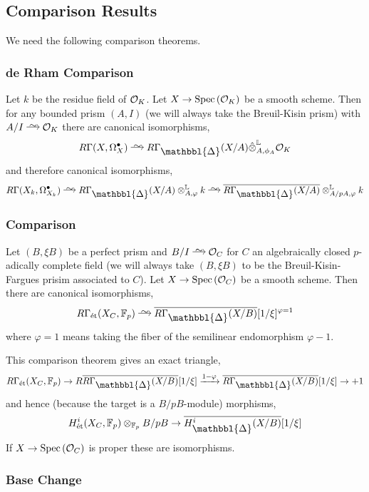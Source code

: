 \documentclass[12pt]{article}
\newcommand{\Prism}{{\mathlarger{\mathbbl{\Delta}}}}
\begin{document}
\subsection{Comparison Results}

We need the following comparison theorems.

\subsubsection{de Rham Comparison}

Let $k$ be the residue field of $\mathcal{O}_K$. Let $X \to \mathrm{Spec}\left( \mathcal{O}_K \right)$ be a smooth scheme. Then for any bounded prism $(A,I)$ (we will always take the Breuil-Kisin prism) with $A/I \iso \cO_K$ there are canonical isomorphisms,
\[ R \Gamma(X, \Omega_X^\bullet) \iso R \Gamma_{\Prism}(X/A) \hat{\ot}^{\LL}_{A, \phi_A} \cO_K \]
and therefore canonical isomorphisms,
\[ R \Gamma(X_k, \Omega_{X_k}^\bullet) \iso R \Gamma_{\Prism}(X/A) \ot^{\LL}_{A, \varphi} k \iso \ol{R \Gamma_{\Prism}(X/A)} \ot_{A/pA, \varphi}^{\LL} k \]

\subsubsection{\etale Comparison}

Let $(B, \xi B)$ be a perfect prism and $B/I \iso \cO_C$ for $C$ an algebraically closed $p$-adically complete field (we will always take $(B, \xi B)$ to be the Breuil-Kisin-Fargues prisim associated to $C$). Let $X \to \mathrm{Spec}\left( \mathcal{O}_C \right)$ be a smooth scheme. Then there are canonical isomorphisms,
\[ R \Gamma_{\et}(X_C, \FF_p) \iso \ol{R \Gamma_{\Prism}(X/B)}[1/\xi]^{\varphi = 1} \]
where $\varphi = 1$ means taking the fiber of the semilinear endomorphism $\varphi - 1$.

\begin{lemma}
This comparison theorem gives an exact triangle,
\[ R \Gamma_{\et}(X_C, \FF_p) \to R \ol{R \Gamma_{\Prism}(X/B)}[1/\xi] \xrightarrow{1 - \varphi} \ol{R \Gamma_{\Prism}(X/B)}[1/\xi] \to +1 \]
and hence (because the target is a $B/pB$-module) morphisms,
\[ H^i_{\et}(X_C, \FF_p) \ot_{\FF_p} B / p B \to \ol{H^i_{\Prism}(X/B)}[1/\xi] \]
If $X \to \mathrm{Spec}\left( \mathcal{O}_C \right)$ is proper these are isomorphisms.
\end{lemma}

\subsubsection{Base Change}
\end{document}
